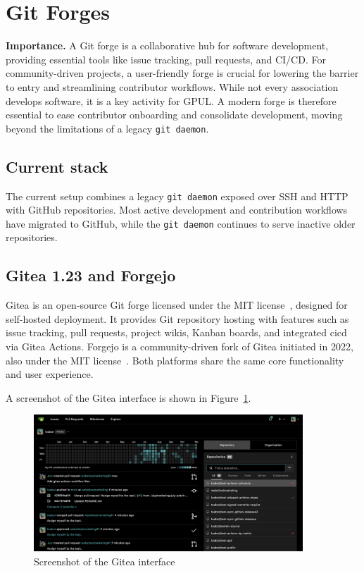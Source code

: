 \section{Git Forges}

\textbf{Importance.} A Git forge is a collaborative hub for software development, providing essential tools like issue tracking, pull requests, and CI/CD. For community-driven projects, a user-friendly forge is crucial for lowering the barrier to entry and streamlining contributor workflows. While not every association develops software, it is a key activity for GPUL. A modern forge is therefore essential to ease contributor onboarding and consolidate development, moving beyond the limitations of a legacy \texttt{git daemon}.

\subsection*{Current stack}
The current setup combines a legacy \verb|git daemon| exposed over SSH and HTTP with GitHub repositories. Most active development and contribution workflows have migrated to GitHub, while the \texttt{git daemon} continues to serve inactive older repositories.

\subsection*{Gitea 1.23 and Forgejo}

Gitea is an open-source Git forge licensed under the MIT license~\cite{gitea-docs}, designed for self-hosted deployment. It provides Git repository hosting with features such as issue tracking, pull requests, project wikis, Kanban boards, and integrated \gls{cicd} via Gitea Actions. Forgejo is a community-driven fork of Gitea initiated in 2022, also under the MIT license~\cite{forgejo-docs}. Both platforms share the same core functionality and user experience.

A screenshot of the Gitea interface is shown in Figure~\ref{fig:gitea-ui}.

\begin{figure}[h!]
  \centering
  \includegraphics[width=0.9\textwidth]{imaxes/gitea-ui.png}
  \caption{Screenshot of the Gitea interface}
  \label{fig:gitea-ui}
\end{figure}

